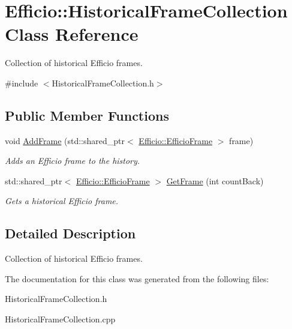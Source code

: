 \hypertarget{class_efficio_1_1_historical_frame_collection}{}\section{Efficio\+:\+:Historical\+Frame\+Collection Class Reference}
\label{class_efficio_1_1_historical_frame_collection}


Collection of historical Efficio frames.  




{\ttfamily \#include $<$Historical\+Frame\+Collection.\+h$>$}

\subsection*{Public Member Functions}
\begin{DoxyCompactItemize}
\item 
\hypertarget{class_efficio_1_1_historical_frame_collection_a8bb93d37d7d634413626c52b5e8d1ea6}{}\label{class_efficio_1_1_historical_frame_collection_a8bb93d37d7d634413626c52b5e8d1ea6} 
void \hyperlink{class_efficio_1_1_historical_frame_collection_a8bb93d37d7d634413626c52b5e8d1ea6}{Add\+Frame} (std\+::shared\+\_\+ptr$<$ \hyperlink{class_efficio_1_1_efficio_frame}{Efficio\+::\+Efficio\+Frame} $>$ frame)
\begin{DoxyCompactList}\small\item\em Adds an Efficio frame to the history. \end{DoxyCompactList}\item 
\hypertarget{class_efficio_1_1_historical_frame_collection_abe5a246b4249f9596aae3cbcf04953b5}{}\label{class_efficio_1_1_historical_frame_collection_abe5a246b4249f9596aae3cbcf04953b5} 
std\+::shared\+\_\+ptr$<$ \hyperlink{class_efficio_1_1_efficio_frame}{Efficio\+::\+Efficio\+Frame} $>$ \hyperlink{class_efficio_1_1_historical_frame_collection_abe5a246b4249f9596aae3cbcf04953b5}{Get\+Frame} (int count\+Back)
\begin{DoxyCompactList}\small\item\em Gets a historical Efficio frame. \end{DoxyCompactList}\end{DoxyCompactItemize}


\subsection{Detailed Description}
Collection of historical Efficio frames. 

The documentation for this class was generated from the following files\+:\begin{DoxyCompactItemize}
\item 
Historical\+Frame\+Collection.\+h\item 
Historical\+Frame\+Collection.\+cpp\end{DoxyCompactItemize}
